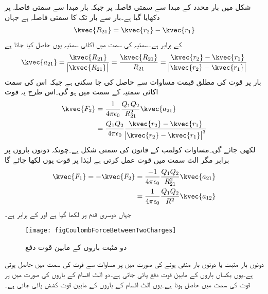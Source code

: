 شکل  میں بار  محدد کے مبدا سے سمتی فاصلہ  پر جبکہ بار  مبدا سے سمتی فاصلہ  پر دکھایا گیا ہے۔بار  سے بار  تک کا سمتی فاصلہ  ہے جہاں
\begin{align}
\kvec{R_{21}}=\kvec{r_2}-\kvec{r_1}
\end{align}
کے برابر ہے۔سمتیہ  کی سمت میں اکائی سمتیہ  یوں حاصل کیا جاتا ہے
\begin{align}
\kvec{a_{21}}=\frac{\kvec{R_{21}}}{\abs{\kvec{R_{21}}}}=\frac{\kvec{R_{21}}}{R_{21}}=\frac{\kvec{r_2}-\kvec{r_1}}{\abs{\kvec{r_2}-\kvec{r_1}}}
\end{align}
بار  پر قوت  کی مطلق قیمت مساوات   سے حاصل کی جا سکتی ہے جبکہ اس کی سمت اکائی سمتیہ  کے سمت میں ہو گی۔اس طرح یہ قوت
\begin{gather}
\begin{aligned}\label{مساوات_کولمب_قوت_کی_مساوات_الف}
\kvec{F_2}&=\frac{1}{4 \pi \epsilon_0}\frac{Q_1 Q_2}{ R_{21}^2} {\kvec{a_{21}}}\\
&=\frac{Q_1 Q_2}{4 \pi \epsilon_0}\frac{\kvec{r_2}-\kvec{r_1}}{\abs{\kvec{r_2}-\kvec{r_1}}^3}
\end{aligned}
\end{gather}
لکھی جائے گی۔مساوات  کولمب کے قانون کی سمتی شکل ہے۔چونکہ دونوں باروں پر برابر مگر الٹ سمت میں قوت عمل کرتی ہے لہٰذا  پر قوت  یوں لکھا جائے گا
 \begin{gather}
\begin{aligned}
\kvec{F_1}=-\kvec{F_2}&=\frac{-1}{4 \pi \epsilon_0}\frac{Q_1 Q_2}{ R_{21}^2} \kvec{a_{21}}\\
&=\frac{1}{4 \pi \epsilon_0}\frac{Q_1 Q_2}{ R^2} {\kvec{a_{12}}}
\end{aligned}
\end{gather}
جہاں دوسری قدم پر  لکھا گیا ہے اور  کے برابر ہے۔
%
\begin{figure}
\centering
\texttt{[image: figCoulombForceBetweenTwoCharges]}
\caption{دو مثبت باروں کے مابین قوت دفع}
\label{شکل_سمتیہ_دو_مثبت_بار_قوت_دفع}
\end{figure}
دونوں بار مثبت یا دونوں بار منفی ہونے کی صورت میں  پر مساوات  سے قوت  کی سمت میں حاصل ہوتی ہے۔یوں یکساں باروں کے مابین قوت دفع پائی جاتی ہے۔دو الٹ اقسام کے باروں کی صورت میں  پر قوت  کی سمت میں حاصل ہوتا ہے۔یوں الٹ اقسام کے باروں کے مابین قوت کشش پائی جاتی ہے۔  


